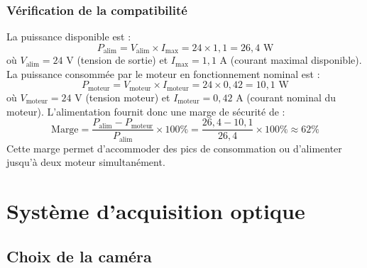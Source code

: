 \subsubsection{Vérification de la compatibilité}
La puissance disponible est :
\begin{equation}
    P_{\text{alim}} = V_{\text{alim}} \times I_{\text{max}} = 24 \times 1,1 = 26,4 \text{ W}
    \label{eq:puissance_alim}
\end{equation}
\noindent où $V_{\text{alim}} = 24$ V (tension de sortie) et $I_{\text{max}} = 1,1$ A (courant maximal disponible).
La puissance consommée par le moteur en fonctionnement nominal est :
\begin{equation}
    P_{\text{moteur}} = V_{\text{moteur}} \times I_{\text{moteur}} = 24 \times 0,42 = 10,1 \text{ W}
    \label{eq:puissance_moteur}
\end{equation}
\noindent où $V_{\text{moteur}} = 24$ V (tension moteur) et $I_{\text{moteur}} = 0,42$ A (courant nominal du moteur).
L'alimentation fournit donc une marge de sécurité de :
\begin{equation}
    \text{Marge} = \frac{P_{\text{alim}} - P_{\text{moteur}}}{P_{\text{alim}}} \times 100\% = \frac{26,4 - 10,1}{26,4} \times 100\% \approx 62\%
    \label{eq:marge_puissance}
\end{equation}
Cette marge permet d'accommoder des pics de consommation ou d'alimenter jusqu'à deux moteur simultanément.
\section{Système d'acquisition optique}
\subsection{Choix de la caméra}
